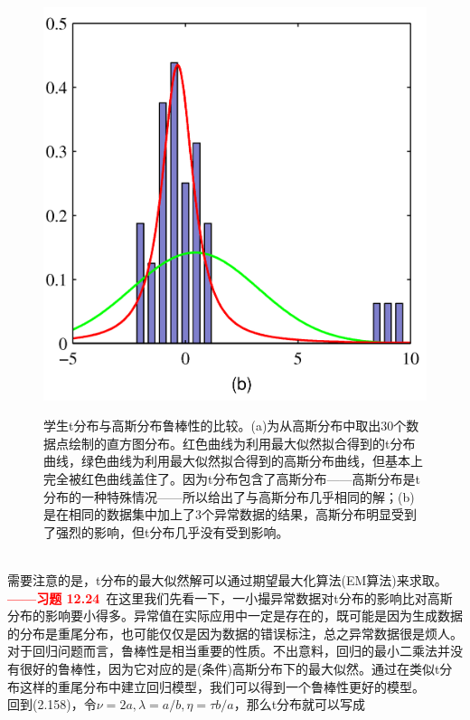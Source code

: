 \documentclass[b5paper]{book}
\numberwithin{equation}{chapter}
\begin{document}
{\begin{figure}[ht]
\begin{minipage}[t]{0.5\linewidth}
		\includegraphics[scale=0.8]{Images/2-16b.png}
		\label{fig:2-16b}
		\end{minipage}
		\caption{学生t分布与高斯分布鲁棒性的比较。(a)为从高斯分布中取出30个数据点绘制的直方图分布。红色曲线为利用最大似然拟合得到的t分布曲线，绿色曲线为利用最大似然拟合得到的高斯分布曲线，但基本上完全被红色曲线盖住了。因为t分布包含了高斯分布——高斯分布是t分布的一种特殊情况——所以给出了与高斯分布几乎相同的解；(b)是在相同的数据集中加上了3个异常数据的结果，高斯分布明显受到了强烈的影响，但t分布几乎没有受到影响。}
	\end{figure}
	\\
	\indent 需要注意的是，t分布的最大似然解可以通过期望最大化算法(EM算法)来求取。\textcolor{red}{\textbf{——习题 12.24}}\ 在这里我们先看一下，一小撮异常数据对t分布的影响比对高斯分布的影响要小得多。异常值在实际应用中一定是存在的，既可能是因为生成数据的分布是重尾分布，也可能仅仅是因为数据的错误标注，总之异常数据很是烦人。对于回归问题而言，鲁棒性是相当重要的性质。不出意料，回归的最小二乘法并没有很好的鲁棒性，因为它对应的是(条件)高斯分布下的最大似然。通过在类似t分布这样的重尾分布中建立回归模型，我们可以得到一个鲁棒性更好的模型。\\
	\indent 回到(2.158)，令$\nu = 2a, \lambda=a/b, \eta=\tau b /a$，那么t分布就可以写成
	\begin{equation}

\end{equation}}
\end{document}
